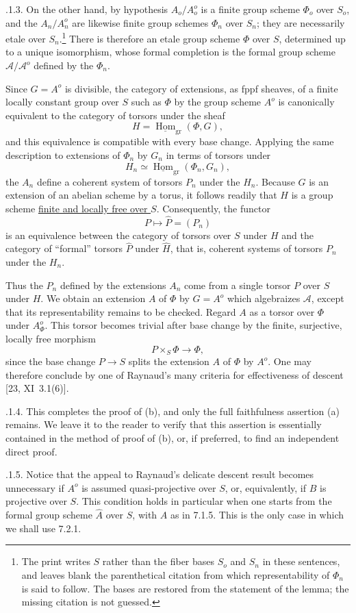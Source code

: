 \medskip
{}.1.3. On the other hand, by hypothesis $A_o/A_o^o$ is a finite
group scheme $\Phi_o$ over $S_o$, and the $A_n/A_n^o$ are likewise
finite group schemes $\Phi_n$ over $S_n$; they are necessarily etale
over $S_n$.\footnote{The print writes $S$ rather than the fiber bases
$S_o$ and $S_n$ in these sentences, and leaves blank the
parenthetical citation from which representability of $\Phi_n$ is
said to follow.  The bases are restored from the statement of the
lemma; the missing citation is not guessed.}  There is therefore an
etale group scheme $\Phi$ over $S$, determined up to a unique
isomorphism, whose formal completion is the formal group scheme
$\mathcal A/\mathcal A^o$ defined by the $\Phi_n$.

Since $G=A^o$ is divisible, the category of extensions, as fppf
sheaves, of a finite locally constant group over $S$ such as $\Phi$
by the group scheme $A^o$ is canonically equivalent to the category
of torsors under the sheaf
\[
 H=\underline{\operatorname{Hom}}_{\mathrm{gr}}(\Phi,G),
\]
and this equivalence is compatible with every base change.  Applying
the same description to extensions of $\Phi_n$ by $G_n$ in terms of
torsors under
\[
 H_n\simeq
 \underline{\operatorname{Hom}}_{\mathrm{gr}}(\Phi_n,G_n),
\]
the $A_n$ define a coherent system of torsors $P_n$ under the $H_n$.
Because $G$ is an extension of an abelian scheme by a torus, it follows
readily that $H$ is a group scheme \underline{finite and locally free
over $S$}.  Consequently, the functor
\[
 P\longmapsto\widehat P=(P_n)
\]
is an equivalence between the category of torsors over $S$ under $H$
and the category of ``formal'' torsors $\widehat P$ under
$\widehat H$, that is, coherent systems of torsors $P_n$ under the
$H_n$.

Thus the $P_n$ defined by the extensions $A_n$ come from a single
torsor $P$ over $S$ under $H$.  We obtain an extension $A$ of $\Phi$
by $G=A^o$ which algebraizes $\mathcal A$, except that its
representability remains to be checked.  Regard $A$ as a torsor over
$\Phi$ under $A^o_\Phi$.  This torsor becomes trivial after base
change by the finite, surjective, locally free morphism
\[
 P\times_S\Phi\longrightarrow\Phi,
\]
since the base change $P\longrightarrow S$ splits the extension $A$
of $\Phi$ by $A^o$.  One may therefore conclude by one of Raynaud's
many criteria for effectiveness of descent [23, XI~3.1(6)].

\medskip
{}.1.4. This completes the proof of (b), and only the full
faithfulness assertion (a) remains.  We leave it to the reader to
verify that this assertion is essentially contained in the method of
proof of (b), or, if preferred, to find an independent direct proof.

\medskip
{}.1.5. Notice that the appeal to Raynaud's delicate descent result
becomes unnecessary if $A^o$ is assumed quasi-projective over $S$, or,
equivalently, if $B$ is projective over $S$.  This condition holds in
particular when one starts from the formal group scheme $\widehat A$
over $S$, with $A$ as in 7.1.5.  This is the only case in which we
shall use 7.2.1.

